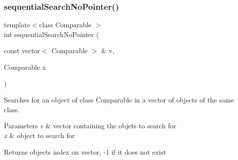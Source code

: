 \subsubsection{\texorpdfstring{sequential\+Search\+No\+Pointer()}{sequentialSearchNoPointer()}}
{\footnotesize\ttfamily template$<$class Comparable $>$ \\
int sequential\+Search\+No\+Pointer (\begin{DoxyParamCaption}\item[{const vector$<$ Comparable $>$ \&}]{v,  }\item[{Comparable}]{x }\end{DoxyParamCaption})}



Searches for an object of class Comparable in a vector of objects of the same class. 


\begin{DoxyParams}{Parameters}
{\em v} & vector containing the objets to search for \\
\hline
{\em x} & object to search for\\
\hline
\end{DoxyParams}
\begin{DoxyReturn}{Returns}
object\textquotesingle{}s index on vector, -\/1 if it does not exist 
\end{DoxyReturn}
